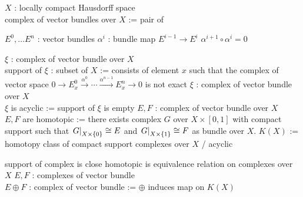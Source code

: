 \begin{Definition}[ベクトル束の複体]
\itemdefi
  \For \(X\) : locally compact Hausdorff space \\
  \Define complex of vector bundles over \(X\) := pair of
  \begin{itemize}
    \itemenum \(E^0 , \ldots E^n\) : vector bundles
    \itemenum \(\alpha^i\) : bundle map \(E^{i-1} \to E^{i}\)
    \itemwith \(\alpha^{i+1} \circ \alpha^i = 0\)
  \end{itemize}
\itemdefi
  \For \(\xi\) : complex of vector bundle over \(X\) \\
  \Define support of \(\xi\) : subset of \(X\) := consists of element \(x\) such that the complex of vector space \(0 \to E^0_x \overset{\alpha^0}{\to} \cdots \overset{\alpha^{n-1}}{\to} E^n_x \to 0\) is not exact
\itemdefi
  \For \(\xi\) : complex of vector bundle over \(X\) \\
  \Define \(\xi\) is acyclic := support of \(\xi\) is empty
\itemdefi
  \For \(E,F\) : complex of vector bundle over \(X\) \\
  \Define \(E,F\) are homotopic := there exists complex \(G\) over \(X \times [0,1]\) with compact support such that \(\left. {G} \right| _{X \times \{0\}} \cong E\) and \(\left. {G} \right| _{X \times \{1\}} \cong F\) as bundle over \(X\).
\itemdefi
  \Define \(K(X)\) := homotopy class of compact support complexes over \(X\) / acyclic
\end{Definition}

\begin{Theorem}
\itemprop
  \Then support of complex is close
\itemprop
  \Then homotopic is equivalence relation on complexes over \(X\)
\itemdefi
  \For \(E,F\) : complexes of vector bundle \\
  \Define \(E \oplus F\) : complex of vector bundle := 
\itemprop
  \Then \(\oplus\) induces map on \(K(X)\)
\end{Theorem}

